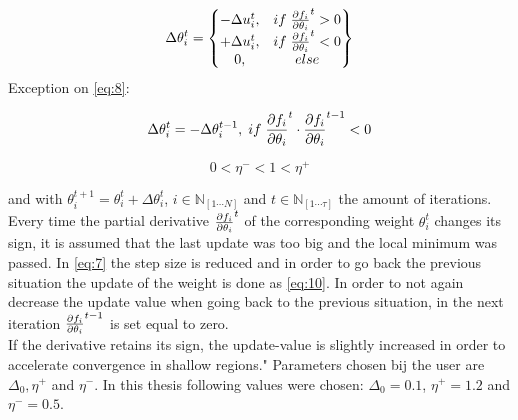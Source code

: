 \begin{equation}\label{eq:8}
\Delta \theta^t_i =
\begin{Bmatrix}
	-\Delta u^t_i, & if \hspace{1 mm} \pdv{f_i}{\theta_i}^t > 0 \\
	+ \Delta u^t_i, & if \hspace{1 mm} \pdv{f_i}{\theta_i}^t < 0 \\
	0, & else 
\end{Bmatrix}
\end{equation}
Exception on \ref{eq:8}:

\begin{equation}\label{eq:10}
	\Delta \theta^t_i = -\Delta \theta^{t-1}_i, \hspace{1mm} if \hspace{1mm} \pdv{f_i}{\theta_i}^t \cdot \pdv{f_i}{\theta_i}^{t-1} < 0
\end{equation}

\begin{equation}\label{eq:9}
	0 <\eta^-<1<\eta^+
\end{equation}

and with $\theta_i^{t+1} = \theta_i^{t} + \Delta \theta^t_i$, $i \in \mathbb{N}_{[1\cdots N]}$ and $t \in \mathbb{N}_[1 \cdots \mathbb{\tau}]$ the amount of iterations. Every time the partial derivative $\pdv{f_i}{\theta_i}^t$ of the corresponding weight $\theta_i^t$ changes its sign, it is assumed that the last update was too big and the local minimum was passed. In \ref{eq:7} the step size is reduced and in order to go back the previous situation the update of the weight is done as \ref{eq:10}. In order to not again decrease the update value when going back to the previous situation, in the next iteration $\pdv{f_i}{\theta_i}^{t-1}$ is set equal to zero.\\
If the derivative retains its sign, the update-value is slightly increased in order to accelerate convergence in shallow regions." \cite{RPROP} Parameters chosen bij the user are $\Delta_0, \eta^+$ and $\eta^-$. In this thesis following values were chosen: $\Delta_0 = 0.1$, $\eta^+ = 1.2$ and $\eta^- = 0.5$.



%



